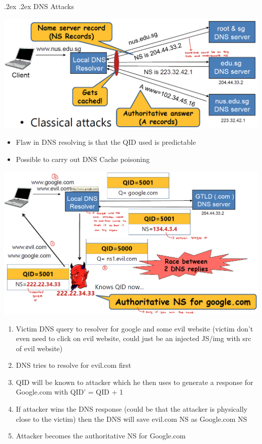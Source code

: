 \documentclass[10pt,landscape,a4paper]{article}
\makeatletter
\renewcommand{\subsubsection}{\@startsection{subsubsection}{1}{0mm}%
	{.2ex}%
	{.2ex}%
	{\rmfamily\bfseries}}
\makeatother
\begin{document}
\begin{multicols*}{4}
\subsubsection{DNS Attacks}
\begin{center}
	\includegraphics[width=0.7\columnwidth]{dns}
\end{center}
\begin{itemize}
	\item Flaw in DNS resolving is that the QID used is predictable
	\item Possible to carry out DNS Cache poisoning
\end{itemize}
\begin{center}
	\includegraphics[width=0.7\columnwidth]{dns-poisoning}
\end{center}
\begin{enumerate}
	\item Victim DNS query to resolver for google and some evil website (victim don't even need to click on evil website, could just be an injected JS/img with src of evil website)
	\item DNS tries to resolve for evil.com first
	\item QID will be known to attacker which he then uses to generate a response for Google.com with QID' = QID + 1
	\item If attacker wins the DNS response (could be that the attacker is physically close to the victim) then the DNS will save evil.com NS as Google.com NS
	\item Attacker becomes the authoritative NS for Google.com
\end{enumerate}

\end{multicols*}
\end{document}
